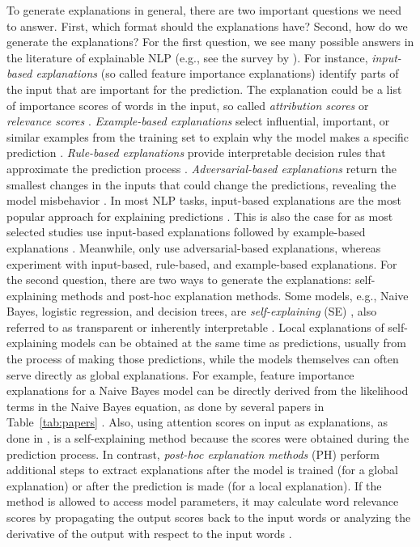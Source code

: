To generate explanations in general, there are two important questions we need to answer. 
First, 
which format should the explanations have?
Second, how do we generate the explanations?
For the first question, we see many possible answers in the literature of explainable NLP (e.g., see the survey by ). For instance, \textit{input-based explanations} (so called feature importance explanations) identify parts of the input that are important for the prediction. 
The explanation could be 
a list of importance scores of words in the input, so called \textit{attribution scores} or \textit{relevance scores} .
\textit{Example-based explanations} select influential, important, or similar examples from the training set to explain why the model makes a specific prediction .
\textit{Rule-based explanations} provide interpretable decision rules that approximate the prediction process
.
\textit{Adversarial-based explanations} return the smallest changes in the inputs that could change the predictions, revealing the model misbehavior .
In most NLP tasks, 
input-based explanations are the most popular approach for explaining predictions . This is also the case for \EBHD as most selected studies use input-based explanations 
followed by example-based explanations
. 
Meanwhile, only  use adversarial-based explanations, whereas  experiment with input-based, rule-based, and example-based explanations. 
For the second question, there are two ways to generate the explanations: self-explaining methods and post-hoc explanation methods. Some models, e.g., Naive Bayes, logistic regression, and decision trees, are \textit{self-explaining} (SE) , 
also referred to as transparent  or inherently interpretable .
Local explanations of self-explaining models can be obtained at the same time as predictions, usually from the process of making those predictions, while 
the models themselves can often serve directly as global explanations.
For example, feature importance explanations for a Naive Bayes model can be directly derived from the likelihood terms in the Naive Bayes equation, as done by several papers in Table~\ref{tab:papers} .
Also, using attention scores on input as explanations, as done in , is a self-explaining method because the scores were obtained during the prediction process. 
In contrast, \textit{post-hoc explanation methods} (PH) perform additional steps to extract explanations after the model is trained (for a global explanation) or after the prediction is made (for a local explanation).
If the method is allowed to access model parameters, it may calculate word relevance scores by propagating the output scores back to the input words  or analyzing the derivative of the output with respect to the input words . 
